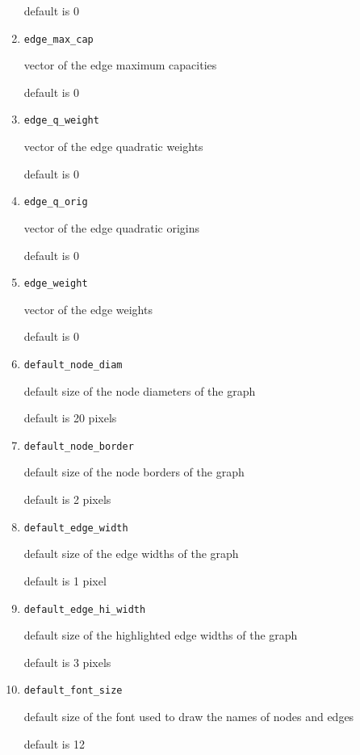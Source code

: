 \documentclass[11pt]{report}
\newcommand{\T}[1]{{\tt #1}}
\begin{document}
\begin{enumerate}
default is 0

  \item \T{edge\_max\_cap}

vector of the edge maximum capacities

default is 0

  \item \T{edge\_q\_weight}

vector of the edge quadratic weights

default is 0

  \item \T{edge\_q\_orig}

vector of the edge quadratic origins

default is 0

  \item \T{edge\_weight}

vector of the edge weights

default is 0

  \item \T{default\_node\_diam}

default size of the node diameters of the graph

default is 20 pixels

  \item \T{default\_node\_border}

default size of the node borders of the graph

default is 2 pixels

  \item \T{default\_edge\_width}

default size of the edge widths of the graph

default is 1 pixel

  \item \T{default\_edge\_hi\_width}

default size of the highlighted edge widths of the graph

default is 3 pixels

  \item \T{default\_font\_size}

default size of the font used to draw the names of nodes and edges

default is 12

\end{enumerate}

\tableofcontents

\listoffigures


\end{document}
